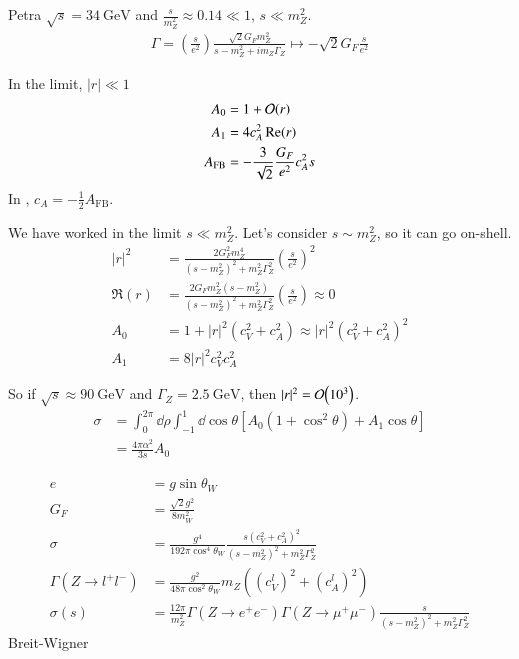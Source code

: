 Petra $\sqrt{s} = \SI{34}{\giga\eV}$ and $\frac{s}{m_Z^2} \approx 0.14 \ll 1 $, $s \ll m_Z^2$.
\begin{align*}
   \Gamma = \left(\frac{s}{e^2}\right) \frac{\sqrt{2} G_F m_Z^2}{s - m_Z^2 + i m_Z \Gamma_Z} \mapsto - \sqrt{2} G_F \frac{s}{e^2}
\end{align*}

In the limit, $|r| \ll 1$ 
\begin{align*}
   A_0 &= 1 + \order{r} \\
   A_1 &= 4 c_A^2 \Re(r) \\
   A_{\text{FB}} &= -\frac{3}{\sqrt{2}} \frac{G_F}{e^2} c_A^2 s
\end{align*}
In \sm, $c_A = - \frac{1}{2} A_{\text{FB}}$.

We have worked in the limit $s \ll m_Z^2$. Let's consider $s \sim m_Z^2$, so it can go on-shell.
\begin{align*}
   |r|^2 &= \frac{2G_F^2 m_Z^4}{(s-m_Z^2)^2 + m_Z^2 \Gamma_Z^2} \left( \frac{s}{e^2} \right)^2 \\
   \Re(r) &= \frac{2 G_F m_Z^2 (s-m_Z^2)}{(s-m_Z^2)^2 + m_Z^2 \Gamma_Z^2} \left( \frac{s}{e^2} \right) \approx 0  \\
   A_0 &= 1 + |r|^2 (c_V^2 + c_A^2) \approx |r|^2 (c_V^2 + c_A^2)^2 \\
   A_1 &= 8 |r|^2 c_V^2 c_A^2
\end{align*}

So if $\sqrt{s} \approx \SI{90}{\giga\eV}$ and $\Gamma_Z = \SI{2.5}{\giga\eV}$, then $|r|^2 = \order{10^3}$.
\begin{align*}
   \sigma &= \int_0^{2\pi}\dd \rho \int_{-1}^{1} \dd{\cos \theta} \left[ A_0 (1+\cos^2 \theta) + A_1 \cos \theta \right] \\
          &= \frac{4 \pi \alpha^2}{3s} A_0
\end{align*}

\begin{align*}
   e &= g \sin \theta_W \\
   G_F &= \frac{\sqrt{2} g^2}{8 m_W^2} \\
   \sigma &= \frac{g^4}{192 \pi \cos^4 \theta_W} \frac{s (c_V^2 + c_A^2)^2}{(s-m_Z^2)^2 + m_Z^2 \Gamma_Z^2} \\
   \Gamma( Z \rightarrow l^+ l^-) &= \frac{g^2}{48\pi \cos^2 \theta_W} m_Z \left( (c_V^l)^2 + (c_A^l)^2 \right) \\
   \sigma(s) &= \frac{12\pi}{m_Z^2} \Gamma(Z \rightarrow e^+ e^-) \Gamma(Z \rightarrow \mu^+ \mu^-) \frac{s}{(s-m_Z^2)^2 + m_Z^2 \Gamma_Z^2}
\end{align*}
Breit-Wigner

